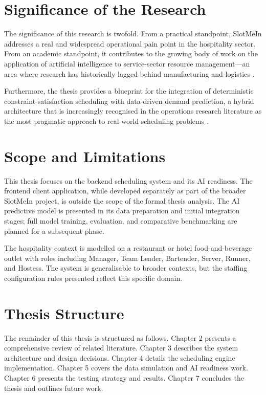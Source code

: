 \documentclass[12pt,a4paper]{report}
\begin{document}
\section{Significance of the Research}

The significance of this research is twofold. From a practical standpoint, SlotMeIn addresses a real and widespread operational pain point in the hospitality sector. From an academic standpoint, it contributes to the growing body of work on the application of artificial intelligence to service-sector resource management—an area where research has historically lagged behind manufacturing and logistics \cite{burke_et_al_2004}.

Furthermore, the thesis provides a blueprint for the integration of deterministic constraint-satisfaction scheduling with data-driven demand prediction, a hybrid architecture that is increasingly recognised in the operations research literature as the most pragmatic approach to real-world scheduling problems \cite{pinedo_2016}.

\section{Scope and Limitations}

This thesis focuses on the backend scheduling system and its AI readiness. The frontend client application, while developed separately as part of the broader SlotMeIn project, is outside the scope of the formal thesis analysis. The AI predictive model is presented in its data preparation and initial integration stages; full model training, evaluation, and comparative benchmarking are planned for a subsequent phase.

The hospitality context is modelled on a restaurant or hotel food-and-beverage outlet with roles including Manager, Team Leader, Bartender, Server, Runner, and Hostess. The system is generalisable to broader contexts, but the staffing configuration rules presented reflect this specific domain.

\section{Thesis Structure}

The remainder of this thesis is structured as follows. Chapter 2 presents a comprehensive review of related literature. Chapter 3 describes the system architecture and design decisions. Chapter 4 details the scheduling engine implementation. Chapter 5 covers the data simulation and AI readiness work. Chapter 6 presents the testing strategy and results. Chapter 7 concludes the thesis and outlines future work.
\end{document}
